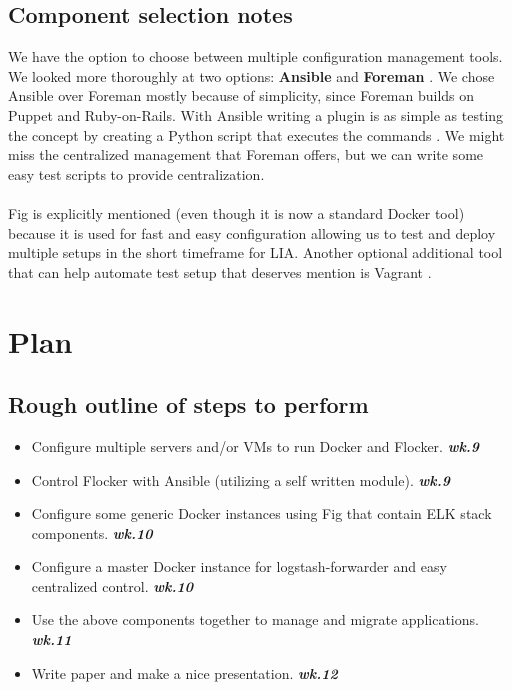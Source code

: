 \documentclass{article}
\begin{document}
\subsection{Component selection notes}
We have the option to choose between multiple  configuration management tools. We looked more thoroughly at two options: \textbf{Ansible} and \textbf{Foreman} \cite{foreman}. We chose Ansible over Foreman mostly because of simplicity, since Foreman builds on Puppet and Ruby-on-Rails\cite{foremandoc}. With Ansible writing a plugin is as simple as testing the concept by creating a Python script that executes the commands \cite{ansiblemod}. We might miss the centralized management that Foreman offers, but we can write some easy test scripts to provide centralization.\\
\\
Fig is explicitly mentioned (even though it is now a standard Docker tool) because it is used for fast and easy configuration allowing us to test and deploy multiple setups in the short timeframe for LIA. Another optional additional tool that can  help automate test setup that deserves mention is Vagrant \cite{vagrant}.

\section{Plan}

\subsection{Rough outline of steps to perform}
\begin{itemize}
\item{Configure multiple servers and/or VMs to run Docker and Flocker. \textbf{\textit{wk.9}}}
\item{Control Flocker with Ansible (utilizing a self written module). \textbf{\textit{wk.9}}}
\item{Configure some generic Docker instances using Fig that contain ELK stack components. \textbf{\textit{wk.10}}}
\item{Configure a master Docker instance for logstash-forwarder and easy centralized control. \textbf{\textit{wk.10}}}
\item{Use the above components together to manage and migrate applications. \textbf{\textit{wk.11}}}
\item{Write paper and make a nice presentation. \textbf{\textit{wk.12}}}
\end{itemize}
\end{document}
